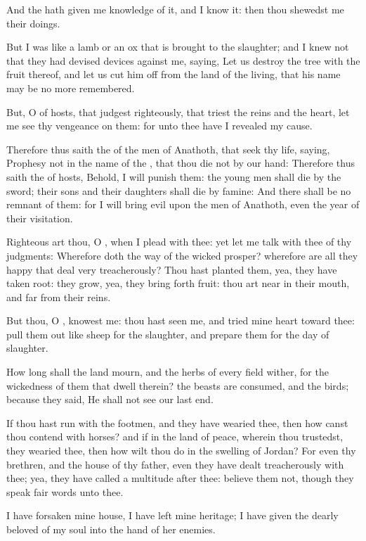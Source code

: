\Verse And the \LORD hath given me knowledge of it, and I know it: then thou shewedst me their doings.

\Verse But I was like a lamb or an ox that is brought to the slaughter; and I knew not that they had devised devices against me, saying, Let us destroy the tree with the fruit thereof, and let us cut him off from the land of the living, that his name may be no more remembered.

\Verse But, O \LORD of hosts, that judgest righteously, that triest the reins and the heart, let me see thy vengeance on them: for unto thee have I revealed my cause.

\Verse Therefore thus saith the \LORD of the men of Anathoth, that seek thy life, saying, Prophesy not in the name of the \LORD, that thou die not by our hand: \Verse Therefore thus saith the \LORD of hosts, Behold, I will punish them: the young men shall die by the sword; their sons and their daughters shall die by famine: \Verse And there shall be no remnant of them: for I will bring evil upon the men of Anathoth, even the year of their visitation.


\Chapter
\Verse Righteous art thou, O \LORD, when I plead with thee: yet let me talk with thee of thy judgments: Wherefore doth the way of the wicked prosper?  wherefore are all they happy that deal very treacherously?  \Verse Thou hast planted them, yea, they have taken root: they grow, yea, they bring forth fruit: thou art near in their mouth, and far from their reins.

\Verse But thou, O \LORD, knowest me: thou hast seen me, and tried mine heart toward thee: pull them out like sheep for the slaughter, and prepare them for the day of slaughter.

\Verse How long shall the land mourn, and the herbs of every field wither, for the wickedness of them that dwell therein? the beasts are consumed, and the birds; because they said, He shall not see our last end.

\Verse If thou hast run with the footmen, and they have wearied thee, then how canst thou contend with horses? and if in the land of peace, wherein thou trustedst, they wearied thee, then how wilt thou do in the swelling of Jordan?  \Verse For even thy brethren, and the house of thy father, even they have dealt treacherously with thee; yea, they have called a multitude after thee: believe them not, though they speak fair words unto thee.

\Verse I have forsaken mine house, I have left mine heritage; I have given the dearly beloved of my soul into the hand of her enemies.

